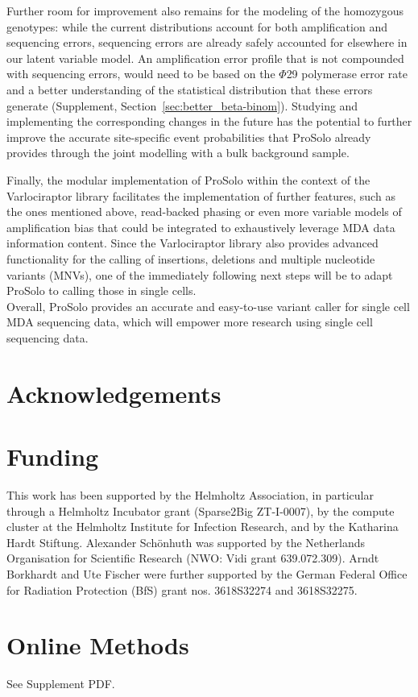 \documentclass[12pt,inline]{wlscirep}
\begin{document}
Further room for improvement also remains for the modeling of the homozygous genotypes: while the current distributions account for both amplification and sequencing errors, sequencing errors are already safely accounted for elsewhere in our latent variable model.
An amplification error profile that is not compounded with sequencing errors, would need to be based on the $\Phi$29 polymerase error rate and a better understanding of the statistical distribution that these errors generate (Supplement, Section~\ref{sec:better_beta-binom}).
Studying and implementing the corresponding changes in the future has the potential to further improve the accurate site-specific event probabilities that ProSolo already provides through the joint modelling with a bulk background sample.

Finally, the modular implementation of ProSolo within the context of the Varlociraptor library\cite{koster_varlociraptor_2020} facilitates the implementation of further features, such as the ones mentioned above, read-backed phasing\cite{bohrson_linked-read_2019,hard_conbase:_2019} or even more variable models of amplification bias\cite{luquette_identification_2019} that could be integrated to exhaustively leverage MDA data information content.
Since the Varlociraptor library also provides advanced functionality for the calling of insertions, deletions and multiple nucleotide variants (MNVs), one of the immediately following next steps will be to adapt ProSolo to calling those in single cells.\\

Overall, ProSolo provides an accurate and easy-to-use variant caller for single cell MDA sequencing data, which will empower more research using single cell sequencing data.



\section*{Acknowledgements}

\section*{Funding}
This work has been supported by the Helmholtz Association, in particular through a Helmholtz Incubator grant (Sparse2Big ZT-I-0007), by the compute cluster at the Helmholtz Institute for Infection Research, and by the Katharina Hardt Stiftung. Alexander Schönhuth was supported by the Netherlands Organisation for Scientific Research (NWO: Vidi grant 639.072.309). Arndt Borkhardt and Ute Fischer were further supported by the German Federal Office for Radiation Protection (BfS) grant nos. 3618S32274 and 3618S32275.

\section{Online Methods}
See Supplement PDF.
\end{document}
